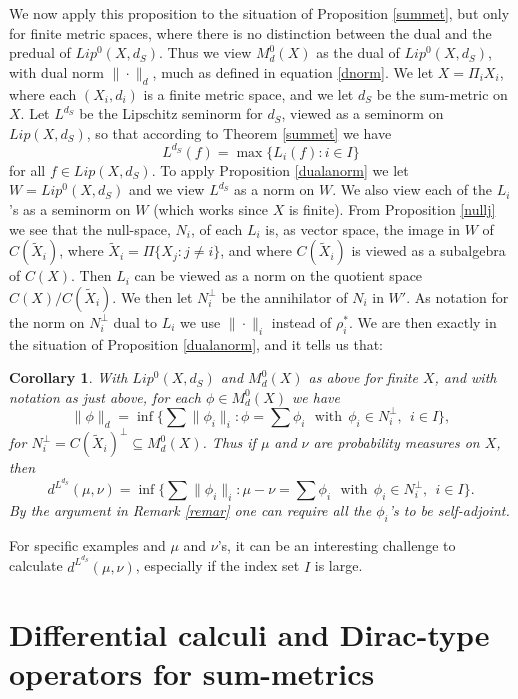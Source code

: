 \documentclass{amsart}[14pt]
\newtheorem{corollary}[theorem]{Corollary}
\theoremstyle{definition}
\theoremstyle{remark}
\newcommand{\<}{\langle}
\renewcommand{\>}{\rangle}
\numberwithin{equation}{section}
\begin{document}
{We now apply this proposition to the situation of Proposition
\ref{summet}, but only for finite metric spaces, where there
is no distinction between the dual and the predual
of $ Lip^0(X, d_S)$. Thus we view $M^0_d(X)$ as the
dual of $ Lip^0(X, d_S)$, with dual norm $\|\cdot\|_d$, much as 
defined in equation \eqref{dnorm}. We let  $X = \Pi_i X_i$, where
each $(X_i, d_i)$ is a finite
metric space, and we let $d_S$
be the sum-metric on $X$.  Let $L^{d_S}$ be the
Lipschitz seminorm for $d_S$, viewed as a
seminorm on $Lip(X, d_S)$, so that according to
Theorem \ref{summet} we have
\[
L^{d_S}(f) = \max\{ L_i(f): i \in I\}
\]
for all $f \in Lip(X, d_S)$. To apply Proposition \ref{dualanorm}
we let $W = Lip^0(X, d_S)$ and we view $L^{d_S}$ as a norm
on $W$. We also view each of the $L_i$'s as a seminorm on
$W$ (which works since $X$ is finite). 
From Proposition \ref{nullj} we see that the null-space, $N_i$,
of each $L_i$ is, as vector space, the image in $W$ of 
$C(\tilde X_i)$, where
$\tilde X_i = \Pi \{X_j: j \neq i\}$, 
and where  $C(\tilde X_i)$ is
viewed as a subalgebra of $C(X)$. Then $L_i$ can be viewed
as a norm on the quotient space $C(X)/C(\tilde X_i)$.
We then let $N_i^\perp$ be the annihilator of $N_i$
in  $W'$. As notation for the norm on $N_i^\perp$ dual to $L_i$
we use $\|\cdot\|_i$ instead of $\rho^*_i$.
We are then exactly in the situation of Proposition \ref{dualanorm},
and it tells us that:

\begin{corollary}
\label{dualw}
With $ Lip^0(X, d_S)$ and $M^0_d(X)$ as above for finite $X$, and
with notation as just above, 
for each $\phi \in M^0_d(X)$ we have
\[
\|\phi\|_d =  
\inf \{ \sum \| \phi_i \|_i : \phi = \sum \phi_i\
\ \ \mathrm{with} \ \  \phi_i \in N_i^ \perp, \ \ i \in I \}   ,
\]
for $N_i^\perp = C(\tilde X_i)^\perp \subseteq M^0_d(X)$. 
Thus if
$\mu$ and $\nu$ are probability measures on $X$, then
\[
d^{L^{d_S}}(\mu, \nu) = \inf \{ \sum \| \phi_i \|_i : \mu - \nu = \sum \phi_i\
\ \ \mathrm{with} \ \  \phi_i \in N_i^ \perp, \ \ i\in I \}    .
\]
By the argument in Remark \ref{remar} one can require all the $\phi_i$'s 
to be self-adjoint.
\end{corollary}

For specific examples and $\mu$ and $\nu$'s, it can be an interesting challenge to calculate
$d^{L^{d_S}}(\mu, \nu)$,  especially if the index set $I$ is large.


\section{Differential calculi and Dirac-type operators for sum-metrics}
\label{dircom}

}
\end{document}
